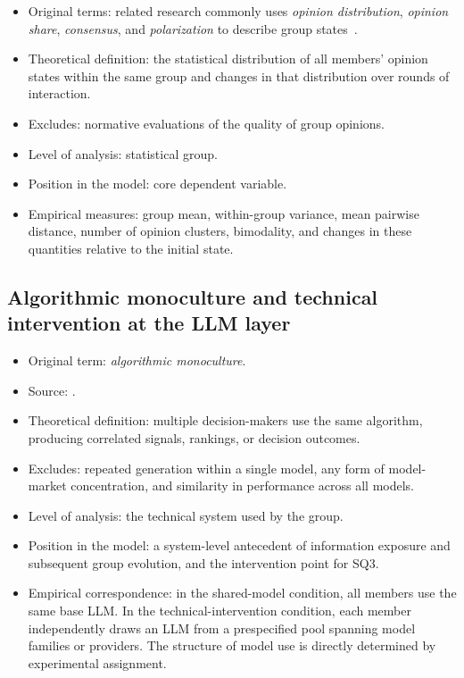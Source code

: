 \documentclass[11pt,a4paper]{article}
\newcommand{\term}[1]{\textit{#1}}
\begin{document}
\begin{itemize}
\item Original terms: related research commonly uses \term{opinion distribution}, \term{opinion share}, \term{consensus}, and \term{polarization} to describe group states~\citep{perra2019,hegselmann2002}.
\item Theoretical definition: the statistical distribution of all members' opinion states within the same group and changes in that distribution over rounds of interaction.
\item Excludes: normative evaluations of the quality of group opinions.
\item Level of analysis: statistical group.
\item Position in the model: core dependent variable.
\item Empirical measures: group mean, within-group variance, mean pairwise distance, number of opinion clusters, bimodality, and changes in these quantities relative to the initial state.
\end{itemize}

\subsection{Algorithmic monoculture and technical intervention at the LLM layer}

\begin{itemize}
\item Original term: \term{algorithmic monoculture}.
\item Source: \citet{kleinberg2021}.
\item Theoretical definition: multiple decision-makers use the same algorithm, producing correlated signals, rankings, or decision outcomes.
\item Excludes: repeated generation within a single model, any form of model-market concentration, and similarity in performance across all models.
\item Level of analysis: the technical system used by the group.
\item Position in the model: a system-level antecedent of information exposure and subsequent group evolution, and the intervention point for SQ3.
\item Empirical correspondence: in the shared-model condition, all members use the same base LLM. In the technical-intervention condition, each member independently draws an LLM from a prespecified pool spanning model families or providers. The structure of model use is directly determined by experimental assignment.
\end{itemize}
\end{document}
